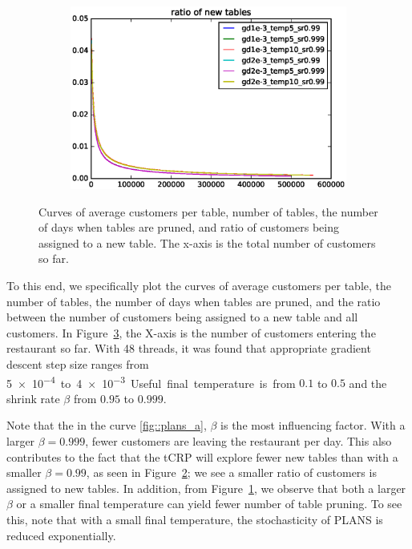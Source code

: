 \begin{figure}[h]
\begin{subfigure}{0.49\textwidth}
    \caption{}
    \label{fig::plans_c}
  \end{subfigure}
  \begin{subfigure}{0.49\textwidth}
    \centering
    \includegraphics[width = \textwidth]{plans/eps/0_1_2_3_4_5_miss.eps}
    \caption{}
    \label{fig::plans_d}
  \end{subfigure}
  \caption{Curves of average customers per table, number of tables, the number
    of days when tables are pruned, and ratio of customers being assigned to a new
  table. The x-axis is the total number of customers so far. }
  \label{fig::plans}
\end{figure}

To this end, we specifically plot the curves of average customers per table, the
number of tables, the number of days when tables are pruned, and the ratio
between the number of customers being assigned to a new table and all customers.
In Figure~\ref{fig::plans}, the X-axis is the number of customers entering the
restaurant so far. With 48 threads, it was found that appropriate gradient
descent step size ranges from \SI{5e-4} to \SI{4e-3}. Useful final temperature
is from $0.1$ to $0.5$ and the shrink rate $\beta$ from $0.95$ to $0.999$.

Note that the in the curve \ref{fig::plans_a}, $\beta$ is the most influencing
factor. With a larger $\beta = 0.999$, fewer customers are leaving the restaurant
per day. This also contributes to the fact that the tCRP will explore fewer new
tables than with a smaller $\beta = 0.99$, as seen in Figure~\ref{fig::plans_d};
we see a smaller ratio of customers is assigned to new tables. In addition, from
Figure~\ref{fig::plans_c}, we observe that both a larger $\beta$ or a smaller
final temperature can yield fewer number of table pruning. To see this,  note
that with a small final temperature, the stochasticity of PLANS is reduced
exponentially.

